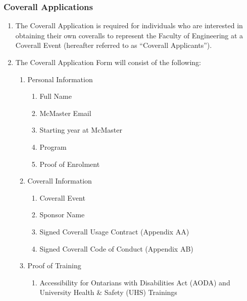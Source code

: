 \begin{enumerate}
\begin{enumerate}
\end{enumerate}

\hypertarget{coverall-applications}{%
 \subsubsection{Coverall Applications}
 \label{coverall-applications}}
\begin{enumerate}
 \item
  The Coverall Application is required for individuals who are
  interested in obtaining their own coveralls to represent the Faculty
  of Engineering at a Coverall Event (hereafter referred to as
  ``Coverall Applicants'').
 \item
  The Coverall Application Form will consist of the following:

  \begin{enumerate}
   \item
    Personal Information

    \begin{enumerate}
     \item
      Full Name
     \item
      McMaster Email
     \item
      Starting year at McMaster
     \item
      Program
     \item
      Proof of Enrolment
    \end{enumerate}
   \item
    Coverall Information

    \begin{enumerate}
     \item
      Coverall Event
     \item
      Sponsor Name
     \item
      Signed Coverall Usage Contract (Appendix AA)
     \item
      Signed Coverall Code of Conduct (Appendix AB)
    \end{enumerate}
   \item
    Proof of Training

    \begin{enumerate}
     \item
      Accessibility for Ontarians with Disabilities Act (AODA) and
      University Health \& Safety (UHS) Trainings


\end{enumerate}
\end{enumerate}
\end{enumerate}
\end{enumerate}
